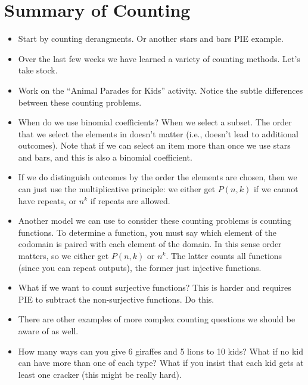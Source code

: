 \documentclass[12pt]{article}
\theoremstyle{plain}
\theoremstyle{definition}
\theoremstyle{remark}
\newcommand{\todayis}[1]{\clearpage{\rhead{\footnotesize #1}}}
\begin{document}
\todayis{Wednesday, September 20}
\section*{Summary of Counting}

\begin{itemize}
  \item Start by counting derangments.  Or another stars and bars PIE example.

	\item Over the last few weeks we have learned a variety of counting methods.  Let's take stock.

	\item Work on the ``Animal Parades for Kids'' activity.  Notice the subtle differences between these counting problems.

	\item When do we use binomial coefficients?  When we select a subset.  The order that we select the elements in doesn't matter (i.e., doesn't lead to additional outcomes).  Note that if we can select an item more than once we use stars and bars, and this is also a binomial coefficient.

	\item If we do distinguish outcomes by the order the elements are chosen, then we can just use the multiplicative principle: we either get $P(n,k)$ if we cannot have repeats, or $n^k$ if repeats are allowed.

	\item Another model we can use to consider these counting problems is counting functions.  To determine a function, you must say which element of the codomain is paired with each element of the domain.  In this sense order matters, so we either get $P(n,k)$ or $n^k$.  The latter counts all functions (since you can repeat outputs), the former just injective functions.

	\item What if we want to count surjective functions?  This is harder and requires PIE to subtract the non-surjective functions.  Do this.

	\item There are other examples of more complex counting questions we should be aware of as well.

	\item How many ways can you give 6 giraffes and 5 lions to  10 kids?  What if no kid can have more than one of each type?  What if you insist that each kid gets at least one cracker (this might be really hard).


\end{itemize}
\end{document}
